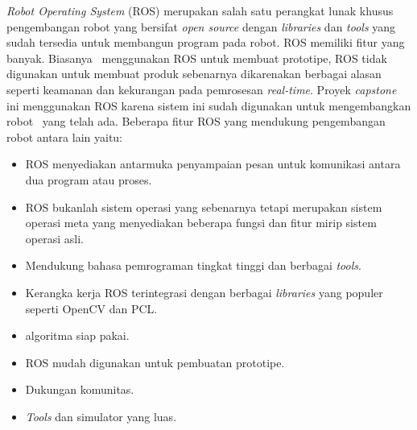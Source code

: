     \textit{Robot Operating System} (ROS) merupakan salah satu perangkat lunak khusus pengembangan robot yang bersifat \textit{open source} dengan \textit{libraries} dan \textit{tools} yang sudah tersedia untuk membangun program pada robot. ROS memiliki fitur yang banyak. Biasanya \dev\ menggunakan ROS untuk membuat prototipe, ROS tidak digunakan untuk membuat produk sebenarnya dikarenakan berbagai alasan seperti keamanan dan kekurangan pada pemrosesan \textit{real-time}\cite{b7}. Proyek \textit{capstone} ini menggunakan ROS karena sistem ini sudah digunakan untuk mengembangkan robot \covid\ yang telah ada.
    \noindent Beberapa fitur ROS yang mendukung pengembangan robot antara lain yaitu:
    \begin{itemize}
     \item ROS menyediakan antarmuka penyampaian pesan untuk komunikasi antara dua program atau proses.
     \item ROS bukanlah sistem operasi yang sebenarnya tetapi merupakan sistem operasi meta yang menyediakan beberapa fungsi dan fitur mirip sistem operasi asli.
     \item Mendukung bahasa pemrograman tingkat tinggi dan berbagai \textit{tools}.
     \item Kerangka kerja ROS terintegrasi dengan berbagai \textit{libraries} yang populer seperti OpenCV dan PCL.
     \item algoritma siap pakai.
     \item ROS mudah digunakan untuk pembuatan prototipe.
     \item Dukungan komunitas.
     \item \textit{Tools} dan simulator yang luas.
     \end{itemize}
